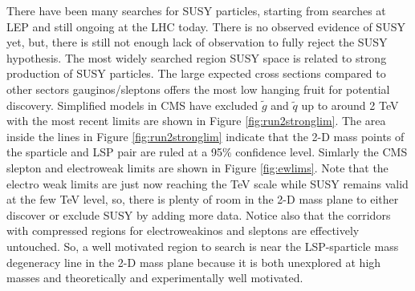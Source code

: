 There have been many searches for SUSY particles, starting from searches at LEP and still ongoing at the LHC today. There is no observed evidence of SUSY yet, but, there is still not enough lack of observation to fully reject the SUSY hypothesis. The most widely searched region SUSY space is related to strong production of SUSY particles. The large expected cross sections compared to other sectors gauginos/sleptons offers the most low hanging fruit for potential discovery.
Simplified models in CMS have excluded $\tilde{g}$ and $\tilde{q}$ up to around 2 TeV with the most recent limits are shown in Figure \ref{fig:run2stronglim}. The area inside the lines in Figure \ref{fig:run2stronglim} indicate that the 2-D mass points of the sparticle and LSP pair are ruled at a 95\% confidence level.
Simlarly the CMS slepton and electroweak limits are shown in Figure \ref{fig:ewlims}. Note that the electro weak limits are just now reaching the TeV scale while SUSY remains valid at the few TeV level, so, there is plenty of room in the 2-D mass plane to either discover or exclude SUSY by adding more data. Notice also that the corridors with compressed regions for electroweakinos and sleptons are effectively untouched. So, a well motivated region to search is near the LSP-sparticle mass degeneracy line in the 2-D mass plane because it is both unexplored at high masses and theoretically and experimentally well motivated.



